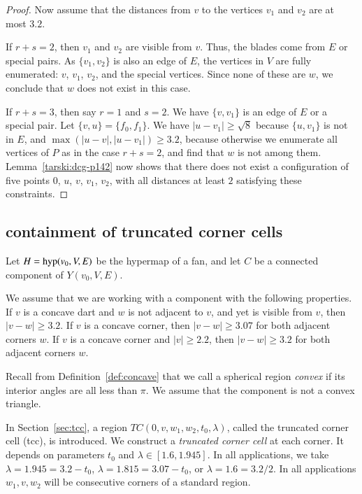 \begin{proof}
Now assume that the distances from $v$ to the vertices $v_1$ and
$v_2$ are at most $3.2$.

If $r+s=2$, then $v_1$ and $v_2$ are visible from $v$. Thus, the
blades come from $E$ or special pairs.  As
$\{v_1,v_2\}$ is also an edge of $E$, the vertices in $V$ are fully
enumerated: $v$, $v_1$, $v_2$, and the special vertices.  
Since none of these are $w$, we conclude that $w$ does
not exist in this case.

If $r+s=3$, then say $r=1$ and $s=2$. We have $\{v,v_1\}$ is
an edge of $E$ or a special pair.  Let
$\{v,u\}=\{f_0,f_1\}$. We
have $|u-v_1|\ge\sqrt8$ because $\{u,v_1\}$ is not in $E$,
and $\max(|u-v|,|u-v_1|)\ge3.2$, because otherwise we enumerate
all vertices of $P$ as in the case $r+s=2$, and find that $w$ is
not among them. Lemma~\ref{tarski:dcg-p142} now shows that
there does not exist a configuration of five points
$0$, $u$, $v$, $v_1$, $v_2$, with all distances at least $2$
satisfying these constraints.
\end{proof}















\subsection{containment of truncated corner cells} %


Let $H ={\operatorname{hyp}}(v_0,V,E)$ be the hypermap of a fan,
and let $C$ be a connected component
of $Y(v_0,V,E)$.

We assume
that we are working with a component
with the following properties. If $v$ is a concave dart and $w$
is not adjacent to $v$, and yet is visible from $v$, then
$|v-w|\ge3.2$. If $v$ is a concave corner, then $|v-w|\ge3.07$ for
both adjacent corners $w$. If $v$ is a concave corner and
$|v|\ge2.2$, then $|v-w|\ge3.2$ for both adjacent corners $w$.


Recall from Definition~\ref{def:concave} that we call a spherical
region {\it convex} if its interior angles are all less than
$\pi$. 
We assume
that the component is
not a convex triangle.

In Section~\ref{sec:tcc}, a region $TC(0,v,w_1,w_2,t_0,\lambda)$,
called the
truncated corner cell (tcc), is introduced.
We construct a {\it truncated corner cell\/} at each corner.  It depends on 
parameters $t_0$ and $\lambda \in [1.6,1.945]$. In all applications, we
take
    $\lambda = 1.945 = 3.2-t_0$, $\lambda = 1.815 = 3.07-t_0$, or
    $\lambda = 1.6 = 3.2/2$.
In all applications $w_1,v,w_2$ will be consecutive corners of
a standard region.

